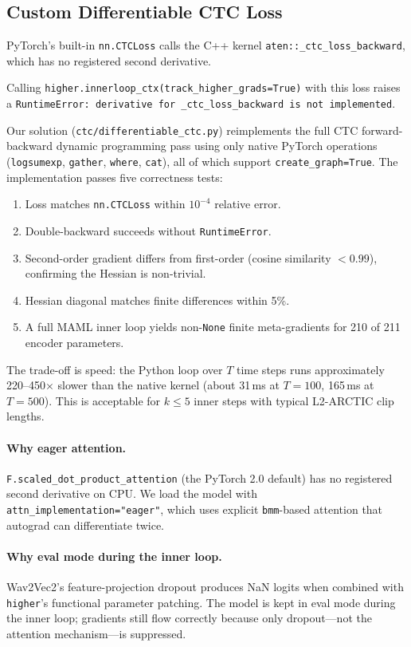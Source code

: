 \documentclass[12pt]{article}
\theoremstyle{plain}
\begin{document}
\subsection{Custom Differentiable CTC Loss}
\label{sec:diffctc}

PyTorch's built-in \verb|nn.CTCLoss| calls the C++ kernel
\verb|aten::_ctc_loss_backward|, which has no registered second derivative.

Calling \verb|higher.innerloop_ctx(track_higher_grads=True)| with this loss
raises a \texttt{RuntimeError: derivative for \_ctc\_loss\_backward is not implemented}.

Our solution (\verb|ctc/differentiable_ctc.py|) reimplements the full CTC
forward-backward dynamic programming pass using only native PyTorch operations
(\verb|logsumexp|, \verb|gather|, \verb|where|, \verb|cat|),
all of which support \verb|create_graph=True|.
The implementation passes five correctness tests:

\begin{enumerate}
  \item Loss matches \verb|nn.CTCLoss| within $10^{-4}$ relative error.
  \item Double-backward succeeds without \texttt{RuntimeError}.
  \item Second-order gradient differs from first-order (cosine similarity $< 0.99$),
        confirming the Hessian is non-trivial.
  \item Hessian diagonal matches finite differences within 5\%.
  \item A full MAML inner loop yields non-\texttt{None} finite meta-gradients
        for 210 of 211 encoder parameters.
\end{enumerate}

The trade-off is speed: the Python loop over $T$ time steps runs approximately
220--450$\times$ slower than the native kernel (about 31\,ms at $T=100$,
165\,ms at $T=500$).
This is acceptable for $k \leq 5$ inner steps with typical L2-ARCTIC clip lengths.

\paragraph{Why eager attention.}
\texttt{F.scaled\_dot\_product\_attention} (the PyTorch 2.0 default) has no
registered second derivative on CPU.
We load the model with \verb|attn_implementation="eager"|, which uses
explicit \verb|bmm|-based attention that autograd can differentiate twice.

\paragraph{Why eval mode during the inner loop.}
Wav2Vec2's feature-projection dropout produces NaN logits when combined with
\texttt{higher}'s functional parameter patching.
The model is kept in eval mode during the inner loop;
gradients still flow correctly because only dropout---not the attention
mechanism---is suppressed.
\end{document}
